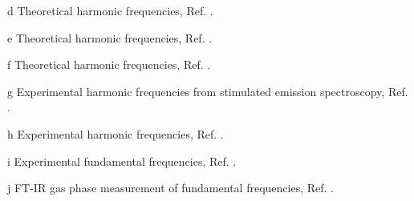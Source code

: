 \begin{center}
\begin{threeparttable}
\begin{tablenotes}
\item[d] Theoretical harmonic frequencies, Ref. .
\item[e] Theoretical harmonic frequencies, Ref. .
\item[f] Theoretical harmonic frequencies, Ref. .
\item[g] Experimental harmonic frequencies from stimulated emission spectroscopy, Ref. .
\item[h] Experimental harmonic frequencies, Ref. .
\item[i] Experimental fundamental frequencies, Ref. .
\item[j] FT-IR gas phase measurement of fundamental frequencies, Ref. .
\end{tablenotes}
\end{threeparttable}
\end{center}
